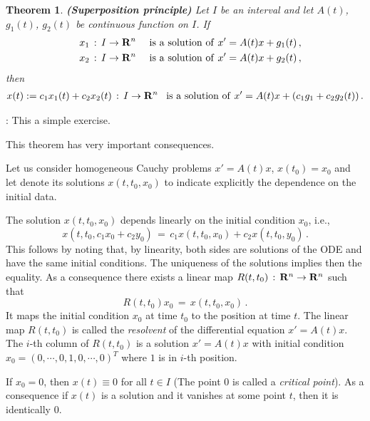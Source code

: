 \documentclass[12pt]{report}
\newcommand{\bR}{{\bf R}}
\newtheorem{theorem}{Theorem}[section]
\newcommand{\proof}{\noindent {\em Proof:~}}
\newcommand{\nn}{\nonumber}
\def\qed{\hbox{\hskip 6pt\vrule width6pt height7pt depth1pt
    \hskip1pt}\bigskip}
\def\to{\rightarrow}
\begin{document}
\begin{theorem}{\bf (Superposition principle)} \label{superpo}
Let $I$ be an interval and let $A(t)$, $g_1(t)$, $g_2(t)$ be
continuous function on $I$. If
\begin{eqnarray}
&& x_1\,:\, I \to \bR^n \quad {\rm ~is~a~solution~of~} x'=A(t)x + g_1(t) \,,
\nn \\
&& x_2\,:\, I \to \bR^n \quad {\rm ~is~a~solution~of~} x'=A(t)x + g_2(t) \,,
\nn 
\end{eqnarray}
then 
\begin{eqnarray}
 x(t):= c_1 x_1(t) + c_2 x_2(t)\,:\, I \to \bR^n \,\,\, 
{\rm ~is~a~solution~of~}  x'=A(t)x + (c_1g_1 + c_2g_2(t))\,.  \nn
\end{eqnarray}
\end{theorem}

\proof: This a simple exercise. \hfill \qed

This theorem has very important consequences. 

\vspace{2mm}
  Let us consider homogeneous 
Cauchy problems $x' = A(t)x$, $x(t_0)=x_0$ and let denote its solutions 
$x(t, t_0,x_0)$ to indicate explicitly the dependence on the initial data. 


 The solution $x(t, t_0, x_0)$ depends linearly on the initial
condition $x_0$, i.e.,
\begin{equation} 
x(t, t_0, c_1x_0 + c_2 y_0)\,=\, c_1x(t, t_0, x_0) + c_2 x(t, t_0, y_0) \,.
\end{equation}
This follows by noting that, by linearity, both sides are solutions of
the ODE and have the same initial conditions. The uniqueness of the
solutions implies then the equality.  As a consequence there exists a
linear map $R(t,t_0)\,:\, \bR^n \to \bR^n$ such that
\begin{equation}
R(t,t_0) x_0 \,=\, x(t,t_0,x_0)\,.
\end{equation}
It maps the initial condition $x_0$ at time $t_0$ to the position at
time $t$.  The linear map $R(t,t_0)$ is called the {\em resolvent} of
the differential equation $x'=A(t)x$. The $i$-th column of $R(t,t_0)$
is a solution $x'=A(t)x$ with initial condition $x_0 = (0, \cdots,
0,1,0,\cdots, 0)^T$ where $1$ is in $i$-th position.

\medskip

 If $x_0=0$, then $x(t)\equiv 0$ for all $t\in I$ (The point
$0$ is called a {\em critical point}).  As a consequence if $x(t)$ is
a solution and it vanishes at some point $t$, then it is identically $0$.
\end{document}
